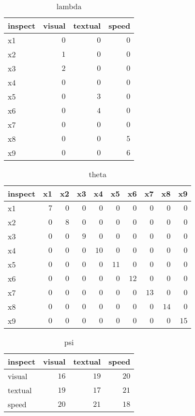 %
\begin{table}[!tbp]
\caption{lambda\label{lambda}} 
\begin{center}
\begin{tabular}{lrrr}
\hline\hline
\multicolumn{1}{l}{inspect}&\multicolumn{1}{c}{visual}&\multicolumn{1}{c}{textual}&\multicolumn{1}{c}{speed}\tabularnewline
\hline
x1&$0$&$0$&$0$\tabularnewline
x2&$1$&$0$&$0$\tabularnewline
x3&$2$&$0$&$0$\tabularnewline
x4&$0$&$0$&$0$\tabularnewline
x5&$0$&$3$&$0$\tabularnewline
x6&$0$&$4$&$0$\tabularnewline
x7&$0$&$0$&$0$\tabularnewline
x8&$0$&$0$&$5$\tabularnewline
x9&$0$&$0$&$6$\tabularnewline
\hline
\end{tabular}
\end{center}
\end{table}

%
\begin{table}[!tbp]
\caption{theta\label{theta}} 
\begin{center}
\begin{tabular}{lrrrrrrrrr}
\hline\hline
\multicolumn{1}{l}{inspect}&\multicolumn{1}{c}{x1}&\multicolumn{1}{c}{x2}&\multicolumn{1}{c}{x3}&\multicolumn{1}{c}{x4}&\multicolumn{1}{c}{x5}&\multicolumn{1}{c}{x6}&\multicolumn{1}{c}{x7}&\multicolumn{1}{c}{x8}&\multicolumn{1}{c}{x9}\tabularnewline
\hline
x1&$7$&$0$&$0$&$ 0$&$ 0$&$ 0$&$ 0$&$ 0$&$ 0$\tabularnewline
x2&$0$&$8$&$0$&$ 0$&$ 0$&$ 0$&$ 0$&$ 0$&$ 0$\tabularnewline
x3&$0$&$0$&$9$&$ 0$&$ 0$&$ 0$&$ 0$&$ 0$&$ 0$\tabularnewline
x4&$0$&$0$&$0$&$10$&$ 0$&$ 0$&$ 0$&$ 0$&$ 0$\tabularnewline
x5&$0$&$0$&$0$&$ 0$&$11$&$ 0$&$ 0$&$ 0$&$ 0$\tabularnewline
x6&$0$&$0$&$0$&$ 0$&$ 0$&$12$&$ 0$&$ 0$&$ 0$\tabularnewline
x7&$0$&$0$&$0$&$ 0$&$ 0$&$ 0$&$13$&$ 0$&$ 0$\tabularnewline
x8&$0$&$0$&$0$&$ 0$&$ 0$&$ 0$&$ 0$&$14$&$ 0$\tabularnewline
x9&$0$&$0$&$0$&$ 0$&$ 0$&$ 0$&$ 0$&$ 0$&$15$\tabularnewline
\hline
\end{tabular}
\end{center}
\end{table}

%
\begin{table}[!tbp]
\caption{psi\label{psi}} 
\begin{center}
\begin{tabular}{lrrr}
\hline\hline
\multicolumn{1}{l}{inspect}&\multicolumn{1}{c}{visual}&\multicolumn{1}{c}{textual}&\multicolumn{1}{c}{speed}\tabularnewline
\hline
visual&$16$&$19$&$20$\tabularnewline
textual&$19$&$17$&$21$\tabularnewline
speed&$20$&$21$&$18$\tabularnewline
\hline
\end{tabular}
\end{center}
\end{table}

